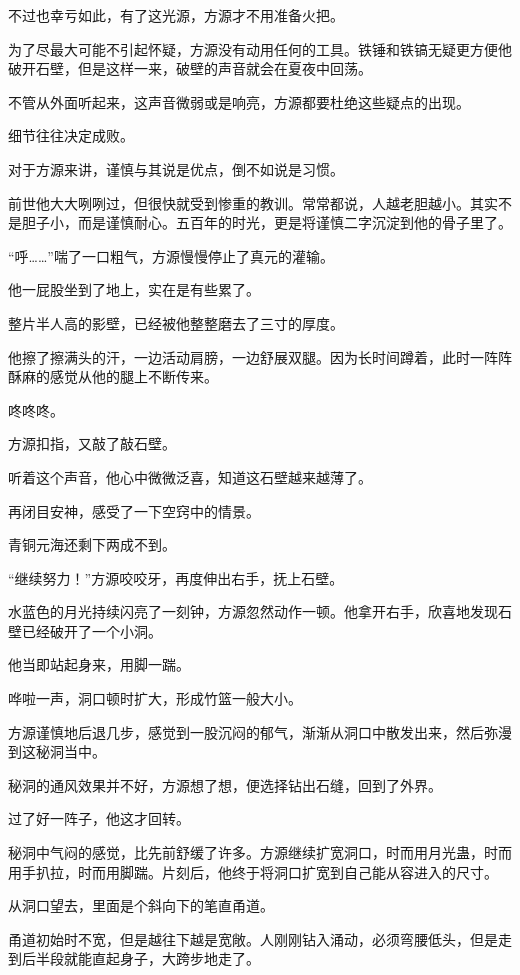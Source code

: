 \begin{this_body}
不过也幸亏如此，有了这光源，方源才不用准备火把。

为了尽最大可能不引起怀疑，方源没有动用任何的工具。铁锤和铁镐无疑更方便他破开石壁，但是这样一来，破壁的声音就会在夏夜中回荡。

不管从外面听起来，这声音微弱或是响亮，方源都要杜绝这些疑点的出现。

细节往往决定成败。

对于方源来讲，谨慎与其说是优点，倒不如说是习惯。

前世他大大咧咧过，但很快就受到惨重的教训。常常都说，人越老胆越小。其实不是胆子小，而是谨慎耐心。五百年的时光，更是将谨慎二字沉淀到他的骨子里了。

“呼……”喘了一口粗气，方源慢慢停止了真元的灌输。

他一屁股坐到了地上，实在是有些累了。

整片半人高的影壁，已经被他整整磨去了三寸的厚度。

他擦了擦满头的汗，一边活动肩膀，一边舒展双腿。因为长时间蹲着，此时一阵阵酥麻的感觉从他的腿上不断传来。

咚咚咚。

方源扣指，又敲了敲石壁。

听着这个声音，他心中微微泛喜，知道这石壁越来越薄了。

再闭目安神，感受了一下空窍中的情景。

青铜元海还剩下两成不到。

“继续努力！”方源咬咬牙，再度伸出右手，抚上石壁。

水蓝色的月光持续闪亮了一刻钟，方源忽然动作一顿。他拿开右手，欣喜地发现石壁已经破开了一个小洞。

他当即站起身来，用脚一踹。

哗啦一声，洞口顿时扩大，形成竹篮一般大小。

方源谨慎地后退几步，感觉到一股沉闷的郁气，渐渐从洞口中散发出来，然后弥漫到这秘洞当中。

秘洞的通风效果并不好，方源想了想，便选择钻出石缝，回到了外界。

过了好一阵子，他这才回转。

秘洞中气闷的感觉，比先前舒缓了许多。方源继续扩宽洞口，时而用月光蛊，时而用手扒拉，时而用脚踹。片刻后，他终于将洞口扩宽到自己能从容进入的尺寸。

从洞口望去，里面是个斜向下的笔直甬道。

甬道初始时不宽，但是越往下越是宽敞。人刚刚钻入涌动，必须弯腰低头，但是走到后半段就能直起身子，大跨步地走了。


\end{this_body}

